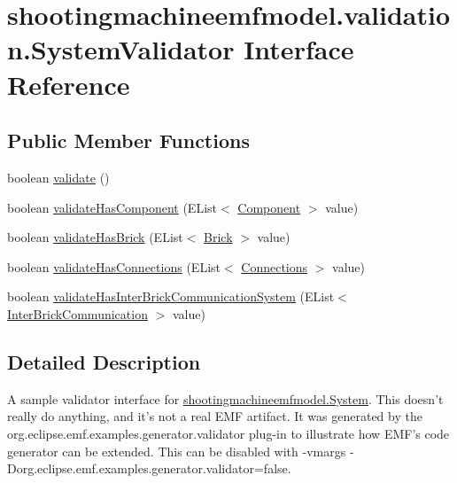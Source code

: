 \hypertarget{interfaceshootingmachineemfmodel_1_1validation_1_1_system_validator}{\section{shootingmachineemfmodel.\-validation.\-System\-Validator Interface Reference}
\label{interfaceshootingmachineemfmodel_1_1validation_1_1_system_validator}
}
\subsection*{Public Member Functions}
\begin{DoxyCompactItemize}
\item 
boolean \hyperlink{interfaceshootingmachineemfmodel_1_1validation_1_1_system_validator_aed25b6edf2fd74b824f7efa810a947a3}{validate} ()
\item 
boolean \hyperlink{interfaceshootingmachineemfmodel_1_1validation_1_1_system_validator_a4f1402fa607fe1515412d09fbbb8fc8e}{validate\-Has\-Component} (E\-List$<$ \hyperlink{interfaceshootingmachineemfmodel_1_1_component}{Component} $>$ value)
\item 
boolean \hyperlink{interfaceshootingmachineemfmodel_1_1validation_1_1_system_validator_a30992019edf5728446ad613810b701f6}{validate\-Has\-Brick} (E\-List$<$ \hyperlink{interfaceshootingmachineemfmodel_1_1_brick}{Brick} $>$ value)
\item 
boolean \hyperlink{interfaceshootingmachineemfmodel_1_1validation_1_1_system_validator_a34f721a0bfbd90bf10845c7f2e16a0e6}{validate\-Has\-Connections} (E\-List$<$ \hyperlink{interfaceshootingmachineemfmodel_1_1_connections}{Connections} $>$ value)
\item 
boolean \hyperlink{interfaceshootingmachineemfmodel_1_1validation_1_1_system_validator_ae1388db48a70a499fd07641d7808635a}{validate\-Has\-Inter\-Brick\-Communication\-System} (E\-List$<$ \hyperlink{interfaceshootingmachineemfmodel_1_1_inter_brick_communication}{Inter\-Brick\-Communication} $>$ value)
\end{DoxyCompactItemize}


\subsection{Detailed Description}
A sample validator interface for \hyperlink{interfaceshootingmachineemfmodel_1_1_system}{shootingmachineemfmodel.\-System}. This doesn't really do anything, and it's not a real E\-M\-F artifact. It was generated by the org.\-eclipse.\-emf.\-examples.\-generator.\-validator plug-\/in to illustrate how E\-M\-F's code generator can be extended. This can be disabled with -\/vmargs -\/\-Dorg.\-eclipse.\-emf.\-examples.\-generator.\-validator=false. 

